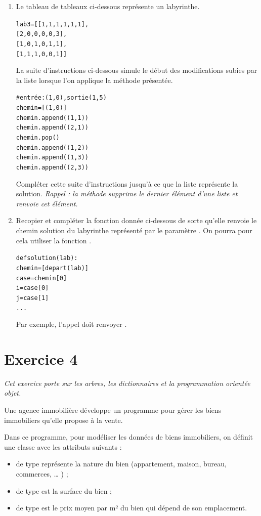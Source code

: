 \documentclass[11pt,a4paper,french,twoside]{PMCours}
\begin{document}
\begin{enumerate}
\begin{enumerate}
\item Le tableau de tableaux  ci-dessous représente un labyrinthe.
\begin{alltt}
lab3 = [[1, 1, 1, 1, 1, 1],
        [2, 0, 0, 0, 0, 3],
        [1, 0, 1, 0, 1, 1],
        [1, 1, 1, 0, 0, 1]]
\end{alltt}
La suite d'instructions ci-dessous simule le début des modifications subies par la liste
 lorsque l'on applique la méthode présentée.
\begin{alltt}
# entrée: (1, 0), sortie (1, 5)
chemin = [(1, 0)]
chemin.append((1, 1))
chemin.append((2, 1))
chemin.pop()
chemin.append((1, 2))
chemin.append((1, 3))
chemin.append((2, 3))
\end{alltt}
Compléter cette suite d'instructions jusqu'à ce que la liste  représente la
solution. \emph{Rappel : la méthode  supprime le dernier élément d'une liste et renvoie cet
élément.}
\item Recopier et compléter la fonction  donnée ci-dessous de sorte qu'elle
renvoie le chemin solution du labyrinthe représenté par le paramètre .
On pourra pour cela utiliser la fonction .
\begin{alltt}
def solution(lab):
    chemin = [depart(lab)]
    case = chemin[0]
    i = case[0]
    j = case[1]
    ...
\end{alltt}
Par exemple, l'appel  doit renvoyer \code{[(1, 0), (1, 1), (1, 2),
(1, 3), (1, 4), (1, 5), (2, 5), (3, 5), (4, 5), (5, 5), (6, 5)]}.
\end{enumerate}
\end{enumerate}


\newpage
\section*{Exercice 4}
\emph{Cet exercice porte sur les arbres, les dictionnaires et la programmation orientée objet.}

\medskip
Une agence immobilière développe un programme pour gérer les biens immobiliers qu'elle
propose à la vente.

Dans ce programme, pour modéliser les données de biens immobiliers, on définit une classe
 avec les attributs suivants :
\begin{itemize}
\item {} de type  représente la nature du bien (appartement, maison, bureau,
commerces, … ) ;
\item {} de type  est la surface du bien ;
\item {} de type  est le prix moyen par m² du bien qui dépend de son
emplacement.
\end{itemize}
\end{document}
